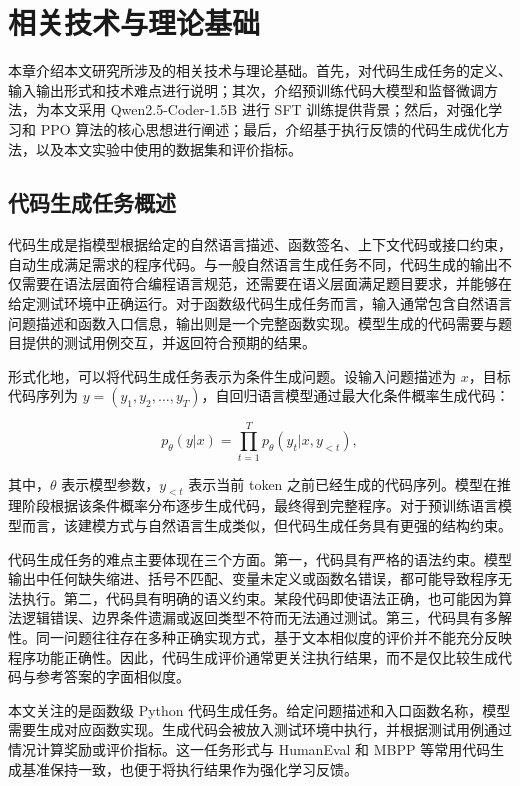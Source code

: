 
\chapter{相关技术与理论基础}

本章介绍本文研究所涉及的相关技术与理论基础。首先，对代码生成任务的定义、输入输出形式和技术难点进行说明；其次，介绍预训练代码大模型和监督微调方法，为本文采用 Qwen2.5-Coder-1.5B 进行 SFT 训练提供背景；然后，对强化学习和 PPO 算法的核心思想进行阐述；最后，介绍基于执行反馈的代码生成优化方法，以及本文实验中使用的数据集和评价指标。

\section{代码生成任务概述}

代码生成是指模型根据给定的自然语言描述、函数签名、上下文代码或接口约束，自动生成满足需求的程序代码。与一般自然语言生成任务不同，代码生成的输出不仅需要在语法层面符合编程语言规范，还需要在语义层面满足题目要求，并能够在给定测试环境中正确运行。对于函数级代码生成任务而言，输入通常包含自然语言问题描述和函数入口信息，输出则是一个完整函数实现。模型生成的代码需要与题目提供的测试用例交互，并返回符合预期的结果。

形式化地，可以将代码生成任务表示为条件生成问题。设输入问题描述为 $x$，目标代码序列为 $y=(y_1,y_2,\ldots,y_T)$，自回归语言模型通过最大化条件概率生成代码：

\begin{equation}
  p_{\theta}(y|x)=\prod_{t=1}^{T}p_{\theta}(y_t|x,y_{<t}),
\end{equation}

其中，$\theta$ 表示模型参数，$y_{<t}$ 表示当前 token 之前已经生成的代码序列。模型在推理阶段根据该条件概率分布逐步生成代码，最终得到完整程序。对于预训练语言模型而言，该建模方式与自然语言生成类似，但代码生成任务具有更强的结构约束。

代码生成任务的难点主要体现在三个方面。第一，代码具有严格的语法约束。模型输出中任何缺失缩进、括号不匹配、变量未定义或函数名错误，都可能导致程序无法执行。第二，代码具有明确的语义约束。某段代码即使语法正确，也可能因为算法逻辑错误、边界条件遗漏或返回类型不符而无法通过测试。第三，代码具有多解性。同一问题往往存在多种正确实现方式，基于文本相似度的评价并不能充分反映程序功能正确性。因此，代码生成评价通常更关注执行结果，而不是仅比较生成代码与参考答案的字面相似度。

本文关注的是函数级 Python 代码生成任务。给定问题描述和入口函数名称，模型需要生成对应函数实现。生成代码会被放入测试环境中执行，并根据测试用例通过情况计算奖励或评价指标。这一任务形式与 HumanEval 和 MBPP 等常用代码生成基准保持一致，也便于将执行结果作为强化学习反馈。

